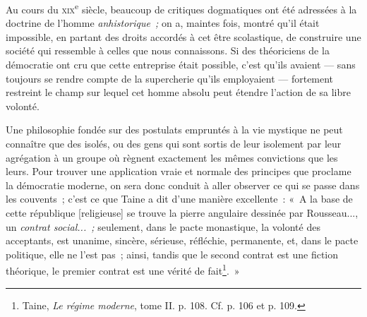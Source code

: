 \documentclass[french,twoside]{book} %
\begin{document}
\noindent Au cours du {\scshape xix}\textsuperscript{e} siècle, beaucoup de critiques dogmatiques ont été adressées à la doctrine de l’homme \emph{anhistorique ;} on a, maintes fois, montré qu’il était impossible, en partant des droits accordés à cet être scolastique, de  construire une société qui ressemble à celles que nous connaissons. Si des théoriciens de la démocratie ont cru que cette entreprise était possible, c’est qu’ils avaient — sans toujours se rendre compte de la supercherie qu’ils employaient — fortement restreint le champ sur lequel cet homme absolu peut étendre l’action de sa libre volonté.\par
Une philosophie fondée sur des postulats empruntés à la vie mystique ne peut connaître que des isolés, ou des gens qui sont sortis de leur isolement par leur agrégation à un groupe où règnent exactement les mêmes convictions que les leurs. Pour trouver une application vraie et normale des principes que proclame la démocratie moderne, on sera donc conduit à aller observer ce qui se passe dans les couvents ; c’est ce que Taine a dit d’une manière excellente : « A la base de cette république [religieuse] se trouve la pierre angulaire dessinée par Rousseau..., un \emph{contrat social... ;} seulement, dans le pacte monastique, la volonté des acceptants, est unanime, sincère, sérieuse, réfléchie, permanente, et, dans le pacte politique, elle ne l’est pas ; ainsi, tandis que le second contrat est une fiction théorique, le premier contrat est une vérité de fait\footnote{ \noindent Taine, \emph{Le régime moderne}, tome II. p. 108. Cf. p. 106 et p. 109.
 }. »\par
\end{document}
